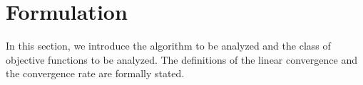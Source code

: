 \documentclass[journal]{IEEEtran}
\providecommand{\ind}[1]{\ensuremath{\mathbbm{1}_{\left\{#1\right\}}}} %
\DeclarePairedDelimiter{\norm}{\lVert}{\rVert}
\theoremstyle{definition}
\newcommand{\yohe}[1]{{\color{cyan}Y.A.: #1}}
\begin{document}
\section{Formulation}

In this section, we introduce the algorithm to be analyzed and the class of objective functions to be analyzed.
The definitions of the linear convergence and the convergence rate are formally stated.

\end{document}
